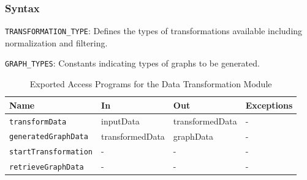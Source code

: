 \documentclass[12pt, titlepage]{article}
\begin{document}
\subsubsection{Syntax}
\begin{description}
  \item[Exported Constants and Access Programs:]
  \item
  \texttt{TRANSFORMATION\_TYPE}: Defines the types of transformations available including normalization and filtering.
  \item 
  \texttt{GRAPH\_TYPES}: Constants indicating types of graphs to be generated.

  \begin{table}[h!]
    \centering
    \begin{tabular}{p{} p{} p{} p{}}
    \toprule
    \textbf{Name} & \textbf{In} & \textbf{Out} & \textbf{Exceptions}\\
    \midrule
    
    \texttt{transformData} & inputData & transformedData & - \\
    \midrule
    
    \texttt{generatedGraphData} & transformedData & graphData & - \\
    \midrule

    \texttt{startTransformation} & - & - & - \\
    \midrule

    \texttt{retrieveGraphData} & - & - & - \\
    
    \bottomrule
    
    \end{tabular}
    \caption{Exported Access Programs for the Data Transformation Module}
    \label{TblEAP_Transformation}
  \end{table}
\end{description}
\end{document}
